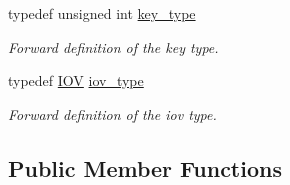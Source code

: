 \begin{DoxyCompactItemize}
typedef unsigned int \hyperlink{class_d_d4hep_1_1_alignments_1_1_alignment_condition_a6ae3e6421b162cdd440b60d5a4e1ed92}{key\+\_\+type}
\begin{DoxyCompactList}\small\item\em Forward definition of the key type. \end{DoxyCompactList}\item 
typedef \hyperlink{class_d_d4hep_1_1_i_o_v}{I\+OV} \hyperlink{class_d_d4hep_1_1_alignments_1_1_alignment_condition_a95e1d25777aca1542555e477c8233968}{iov\+\_\+type}
\begin{DoxyCompactList}\small\item\em Forward definition of the iov type. \end{DoxyCompactList}\end{DoxyCompactItemize}
\subsection*{Public Member Functions}
